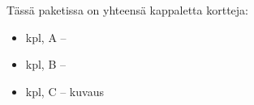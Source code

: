 Tässä paketissa on yhteensä  kappaletta kortteja:

\small{
\begin{itemize}
	\item {} kpl, A -- \kuvausA
	\item {} kpl, B -- \kuvausB
	\item {} kpl, C -- kuvaus
\end{itemize}
}
\newpage